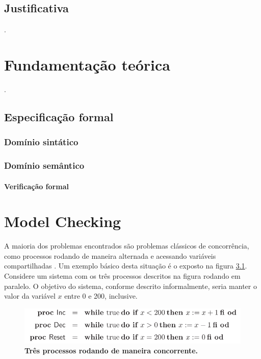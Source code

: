 \documentclass[12pt,openright,oneside,chapter=TITLE,section=TITLE,hidelinks,brazil]{utfpr-pg}
\begin{document}
\section{Justificativa}
\lipsum[4-7] \cite{gummalla}.

\chapter{Fundamentação teórica}
\lipsum[2-4] \cite{wing98}.

\section{Especificação formal}
\lipsum[7-9]
\subsection{Domínio sintático}
\lipsum[10-11]
\subsection{Domínio semântico}
\lipsum[12-15]
\subsubsection{Verificação formal}
\lipsum[16-17]
\lipsum[20-27]

\chapter{Model Checking}

A maioria dos problemas encontrados são problemas clássicos de concorrência, como processos rodando de maneira alternada e acessando variáveis compartilhadas \cite{Katoen08}. Um exemplo básico desta situação é o exposto na figura \ref{fig:interleaving}. Considere um sistema com os três processos descritos na figura rodando em paralelo. O objetivo do sistema, conforme descrito informalmente, seria manter o valor da variável $\mathit{x}$ entre 0 e 200, inclusive.
\begin{figure}[h]
  \centering
  \includegraphics[scale=.5]{interleaving.png}
  \caption{\textbf{Três processos rodando de maneira concorrente.}}
  \label{fig:interleaving}
\end{figure}
\end{document}
